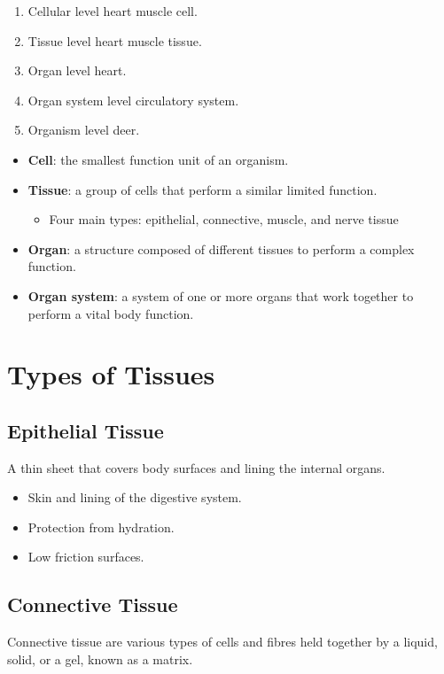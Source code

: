 \documentclass[12pt]{report}
\begin{document}
\begin{enumerate}
\setlength\itemsep{0.5em}
    \item{Cellular level heart muscle cell.}
    \item{Tissue level heart muscle tissue.}
    \item{Organ level heart.}
    \item{Organ system level circulatory system.}
    \item{Organism level deer.}
\end{enumerate}
\invis
\begin{itemize}
    \item{ \textbf{Cell}: the smallest function unit of an organism.}
    \item{ \textbf{Tissue}: a group of cells that perform a similar limited function.}
        \begin{itemize}
            \item{Four main types: epithelial, connective, muscle, and nerve tissue}
        \end{itemize}
    \item{ \textbf{Organ}: a structure composed of different tissues to perform a complex function.}
    \item{ \textbf{Organ system}: a system of one or more organs that work together to perform a vital body function.}
\end{itemize}

\section{Types of Tissues}
\subsection{Epithelial Tissue}
\begin{definition}
    A thin sheet that covers body surfaces and lining the internal organs.
\end{definition}

\begin{itemize}
    \item{Skin and lining of the digestive system.}
    \item{Protection from hydration.}
    \item{Low friction surfaces.}
\end{itemize}

\subsection{Connective Tissue}
\begin{definition}
    Connective tissue are various types of cells and fibres held together by a liquid, solid, or a gel, known as a matrix.
\end{definition}
\end{document}
